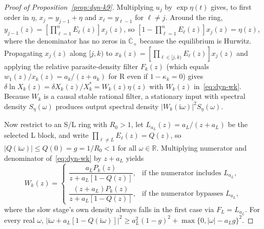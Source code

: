 \begin{proof}[Proof of Proposition~{\upshape\ref{prop:dyn-k9}}]
Multiplying $u_j$ by $\exp\eta(t)$ gives, to first order in $\eta$, $x_j = y_{j-1} + \eta$ and $x_\ell = y_{\ell - 1}$ for $\ell \ne j$. Around the ring, $y_{j-1}(z) = [\prod_{\ell=1}^n E_\ell(z)]x_j(z)$, so $[1 - \prod_{\ell=1}^n E_\ell(z)]x_j(z) = \eta(z)$, where the denominator has no zeros in $\overline{\mathbb{C}}_+$ because the equilibrium is Hurwitz. Propagating $x_j(z)$ along $[j, k)$ to $x_k(z) = [\prod_{\ell \in [j, k)} E_\ell(z)]x_j(z)$ and applying the relative parasite-density filter $F_k(z)$ (which equals $w_1(z)/x_k(z) = a_k/(z + a_k)$ for R even if $1 - \kappa_k = 0$) gives $\delta\ln X_k(z) = \delta X_k(z)/X_k^* = W_k(z)\eta(z)$ with $W_k(z)$ in~\eqref{eq:dyn-wk}. Because $W_k$ is a causal stable rational filter, a stationary input with spectral density $S_\eta(\omega)$ produces output spectral density $|W_k(\mathrm{i}\omega)|^2 S_\eta(\omega)$.

Now restrict to an S/L ring with $R_0 > 1$, let $L_{a_L}(z) = a_L/(z + a_L)$ be the selected L block, and write $\prod_{\ell \ne L} E_\ell(z) = Q(z)$, so $|Q(\mathrm{i}\omega)| \le Q(0) = g = 1/R_0 < 1$ for all $\omega \in \mathbb{R}$. Multiplying numerator and denominator of~\eqref{eq:dyn-wk} by $z + a_L$ yields
\[
W_k(z) = \begin{cases}
\dfrac{a_L P_k(z)}{z + a_L[1 - Q(z)]}, & \text{if the numerator includes } L_{a_L}, \\[6pt]
\dfrac{(z + a_L)P_k(z)}{z + a_L[1 - Q(z)]}, & \text{if the numerator bypasses } L_{a_L},
\end{cases}
\]
where the slow stage's own density always falls in the first case via $F_L = L_{a_L}$. For every real $\omega$, $|\mathrm{i}\omega+a_L[1-Q(\mathrm{i}\omega)]|^2\geq a_L^2(1-g)^2+\max\{0,|\omega|-a_Lg\}^2$.


\end{proof}
